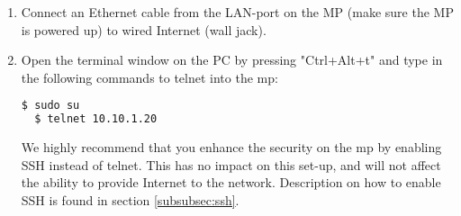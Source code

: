 \begin{enumerate}
\begin{enumerate}
\item In the field "BSSID" enter "02:CA:FF:EE:BA:BE", like shown in .
\item Under the tab "IPv4 Settings" choose "Manual" in the "Method" drop-down menu, like shown in . 
\item Then press "Add" on the same page. Enter the following parameters, like shown in :
\begin{description}
\item[] \textbf{Address:} 10.10.1.245
\item[] \textbf{Netmask:} 24
\item[] \textbf{Gateway:} 10.130.1.1
\end{description}
\begin{figure}[h!]
        \centering
        \begin{subfigure}[t]{0.49\textwidth}
                \texttt{[image: bssid.PNG]}
                \caption{\textbf{The correct BSSID set.}}\label{fig:bssid}
        \end{subfigure}
        \begin{subfigure}[t]{0.49\textwidth}
                \texttt{[image: ipv4settings.PNG]}
                \caption{\textbf{The correct parameters set under IPv4 settings.}}\label{fig:ipv4settings}
        \end{subfigure}
\caption{"Edit Connections" settings on Linux}
\end{figure}
\item Press "Save" on the "Editing vt-mesh"-window, and then "Close" on the "Network Connections"-window. 
\item Then choose "vt-mesh" from the list of available networks. This list is found after pressing the WiFi symbol in the top right corner on your screen. The PC should then be connected to the MP via WiFi. 
\end{enumerate}
\item Connect an Ethernet cable from the LAN-port on the MP (make sure the MP is powered up) to wired Internet (wall jack).
\item Open the terminal window on the PC by pressing "Ctrl+Alt+t" and type in the following commands to telnet into the \gls{mp}:
\noindent
\begin{lstlisting}[language=bash]
  $ sudo su
  $ telnet 10.10.1.20
\end{lstlisting}
We highly recommend that you enhance the security on the \gls{mp} by enabling SSH instead of telnet. This has no impact on this set-up, and will not affect the ability to provide Internet to the network. Description on how to enable SSH is found in section \ref{subsubsec:ssh}.

\end{enumerate}

